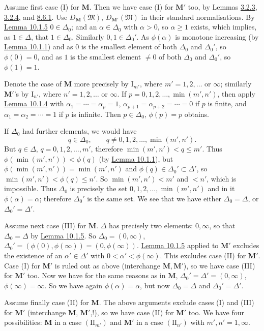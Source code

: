 \documentclass[12pt,b5paper,twoside]{article}
\newcommand{\M}{\mathbf M}
\newcommand{\lemref}[1]{\hyperref[lem:#1]{Lemma #1}}
\begin{document}
Assume first case (I) for $\M$. Then we have case (I) for $\M'$ too, by
Lemmas \hyperref[lem:3.2.3]{3.2.3},
\hyperref[lem:3.2.4]{3.2.4}, and \hyperref[lem:8.6.1]{8.6.1}. Use
$D_{\M}(\mathfrak M)$, $D_{\M'}(\mathfrak M)$ in their standard
normalisations. By \lemref{10.1.5} $0\in\Delta_0$; and an
$\alpha\in\Delta_0$ with $\alpha>0$, so $\alpha\geq1$ exists, which
implies, as $1\in\Delta$, that $1\in\Delta_0$. Similarly
$0,1\in\Delta_0'$. As $\phi(\alpha)$ is monotone increasing (by
\lemref{10.1.1}) and as $0$ is the smallest element of both $\Delta_0$ and
$\Delta_0'$, so $\phi(0)=0$, and as $1$ is the smallest element $\ne0$ of
both $\Delta_0$ and $\Delta_0'$, so $\phi(1)=1$.

Denote the case of $\M$ more precisely by $\mathrm I_{m'}$, where
$m'=1,2,\ldots$ or $\infty$; similarly $\M'$'s by $\mathrm I_{n'}$,
where $n'=1,2,\ldots$ or $\infty$. If
$p=0,1,2,\ldots,\min(m',n')$, then apply \lemref{10.1.4} with
$\alpha_1=\cdots=\alpha_p=1$,
$\alpha_{p+1}=\alpha_{p+2}=\cdots=0$ if $p$ is finite, and
$\alpha_1=\alpha_2=\cdots=1$ if $p$ is infinite. Then
$p\in\Delta_0$, $\phi(p)=p$ obtains.

If $\Delta_0$ had further elements, we would have
\[
 q\in\Delta_0,
 \qquad q\ne0,1,2,\ldots,\min(m',n').
\]
But $q\in\Delta$, $q=0,1,2,\ldots,m'$, therefore
$\min(m',n')<q\leq m'$. Thus
$\phi(\min(m',n'))<\phi(q)$ (by \lemref{10.1.1}), but
$\phi(\min(m',n'))=\min(m',n')$ and
$\phi(q)\in\Delta_0'\subset\Delta'$, so
$\min(m',n')<\phi(q)\leq n'$. So $\min(m',n')<m'$ and $<n'$, which is
impossible. Thus $\Delta_0$ is precisely the set
$0,1,2,\ldots,\min(m',n')$ and in it $\phi(\alpha)=\alpha$; therefore
$\Delta_0'$ is the same set. We see that we have either
$\Delta_0=\Delta$, or $\Delta_0'=\Delta'$.

Assume next case (III) for $\M$. $\Delta$ has precisely two elements:
$0,\infty$, so that $\Delta_0=\Delta$ by \lemref{10.1.5}. So
$\Delta_0=(0,\infty)$,
$\Delta_0'=(\phi(0),\phi(\infty))=(0,\phi(\infty))$.
\lemref{10.1.5} applied to $\M'$ excludes the existence of an
$\alpha'\in\Delta'$ with $0<\alpha'<\phi(\infty)$. This excludes case
(II) for $\M'$. Case (I) for $\M'$ is ruled out as above (interchange
$\M,\M'$), so we have case (III) for $\M'$ too. Now we have for the same
reasons as in $\M$, $\Delta_0'=\Delta'=(0,\infty)$,
$\phi(\infty)=\infty$. So we have again $\phi(\alpha)=\alpha$, but now
$\Delta_0=\Delta$ and $\Delta_0'=\Delta'$.

Assume finally case (II) for $\M$. The above arguments exclude cases (I)
and (III) for $\M'$ (interchange $\M$, $\M'$,!), so we have case (II) for
$\M'$ too. We have four possibilities: $\M$ in a case
$(\mathrm{II}_{m'})$ and $\M'$ in a case $(\mathrm{II}_{n'})$ with
$m',n'=1,\infty$.
\end{document}
